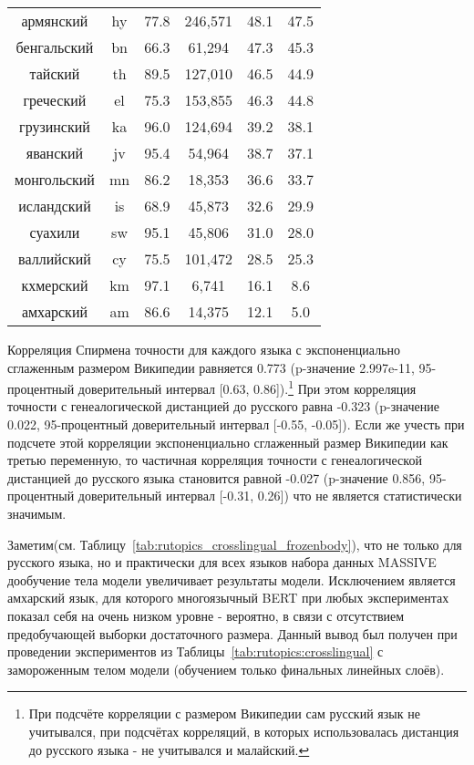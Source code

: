 \begin{table*}[!htbp]
\begin{minipage}{0.5\textwidth}
{\begin{tabular}[baseline={(0,2.1)}]{|c|c|c|c|c|c|}
армянский & hy & 77.8 & 246,571 & 48.1 & 47.5\\
бенгальский & bn & 66.3 & 61,294 & 47.3 & 45.3\\
тайский & th & 89.5 & 127,010 & 46.5 & 44.9\\
греческий & el & 75.3 & 153,855 & 46.3 & 44.8\\
грузинский & ka & 96.0 & 124,694 & 39.2 & 38.1\\
яванский & jv & 95.4 & 54,964 & 38.7 & 37.1\\
монгольский & mn & 86.2 & 18,353 & 36.6 & 33.7\\
исландский & is & 68.9 & 45,873 & 32.6 & 29.9\\
суахили & sw & 95.1 & 45,806 & 31.0 & 28.0\\
валлийский & cy & 75.5 & 101,472 & 28.5 & 25.3\\
кхмерский & km & 97.1 & 6,741 & 16.1 & 8.6\\
амхарский & am & 86.6 & 14,375 & 12.1 & 5.0\\ \hline
\hline
\end{tabular}
}
\end{minipage}
\end{table*}

Корреляция Спирмена точности для каждого языка с экспоненциально сглаженным размером Википедии равняется 0.773 (p-значение 2.997e-11, 95-процентный доверительный интервал [0.63, 0.86]).\footnote{При подсчёте корреляции с размером Википедии сам русский язык не учитывался, при подсчётах корреляций, в которых использовалась дистанция до русского языка - не учитывался и малайский.} При этом корреляция точности с генеалогической дистанцией до русского равна -0.323 (p-значение 0.022, 95-процентный доверительный интервал [-0.55, -0.05]). Если же учесть при подсчете этой корреляции экспоненциально сглаженный размер Википедии как третью переменную, то частичная корреляция точности с генеалогической дистанцией до русского языка становится равной -0.027 (p-значение 0.856, 95-процентный доверительный интервал [-0.31, 0.26]) что не является статистически значимым.

Заметим(см. Таблицу~\ref{tab:rutopics_crosslingual_frozenbody}), что не только для русского языка, но и практически для всех языков набора данных MASSIVE дообучение тела модели увеличивает результаты модели. Исключением является амхарский язык, для которого многоязычный BERT при любых экспериментах показал себя на очень низком уровне - вероятно, в связи с отсутствием предобучающей выборки достаточного размера. Данный вывод был получен при проведении экспериментов из Таблицы~\ref{tab:rutopics:crosslingual} с замороженным телом модели (обучением только финальных линейных слоёв).

